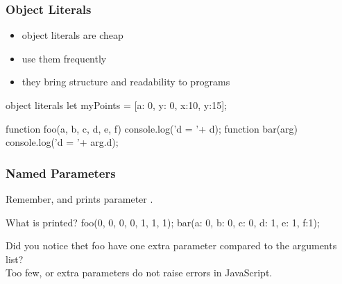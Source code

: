 \begin{frame}[fragile] \frametitle{Object Literals}
\begin{itemize}
  \item object literals are cheap
  \item use them frequently
  \item they bring structure and readability to programs
\end{itemize}
\begin{CodeBox}{object literals}
let myPoints = [{a: 0, y: 0}, {x:10, y:15}];

function foo(a, b, c, d, e, f) {
 console.log('d = '+ d);
}
function bar(arg) {
 console.log('d = '+ arg.d);
}
\end{CodeBox}
\end{frame}

\begin{frame}[fragile] \frametitle{Named Parameters}
Remember,  and  prints parameter .
\vspace{5mm}
\begin{CodeBox}{What is printed?}
foo(0, 0, 0, 0, 1, 1, 1);
bar({a: 0, b: 0, c: 0, d: 1, e: 1, f:1});
\end{CodeBox}
\vspace{10mm}
Did you notice thet foo have one extra parameter compared to the arguments list?
\\ Too few, or extra parameters do not raise errors in JavaScript. 
\end{frame}

